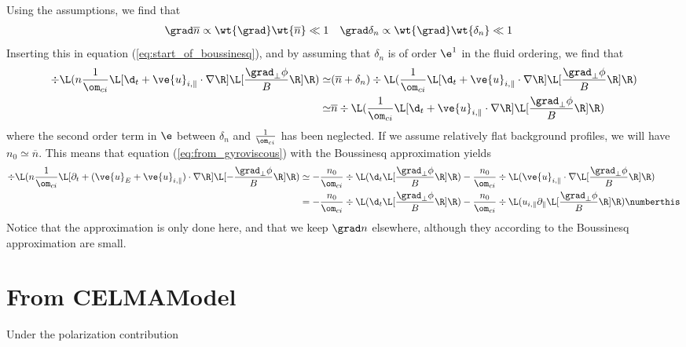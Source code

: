 Using the assumptions, we find that
%
\begin{align*}
    &\grad \overline{n} \propto \wt{\grad} \wt{\overline{n}} \ll 1
    &
    &\grad \delta_n \propto \wt{\grad} \wt{\delta_n} \ll 1&
\end{align*}
%
Inserting this in equation (\ref{eq:start_of_boussinesq}), and by assuming that
$\delta_n$ is of order $\e^1$ in the fluid ordering, we find that
%
\begin{align*}
 \div\L( n
  \frac{1}{\om_{ci}}
  \L[
      \d_t + \ve{u}_{i,\|}\cdot\nabla
  \R]
  \L[
     \frac{\grad_\perp \phi}{B}
  \R]
 \R)
 \simeq&
 (\overline{n} + \delta_n)\div\L(
  \frac{1}{\om_{ci}}
  \L[
      \d_t + \ve{u}_{i,\|}\cdot\nabla
  \R]
  \L[
     \frac{\grad_\perp \phi}{B}
  \R]
  \R)\\
 \simeq&
 \overline{n}\div\L(
  \frac{1}{\om_{ci}}
  \L[
      \d_t + \ve{u}_{i,\|}\cdot\nabla
  \R]
  \L[
     \frac{\grad_\perp \phi}{B}
  \R]
 \R)
\end{align*}
%
where the second order term in $\e$ between $\delta_n$ and $\frac{1}{\om_{ci}}$ has
been neglected. If we assume relatively flat background profiles, we will have
$n_0 \simeq \overline{n}$.  This means that equation
(\ref{eq:from_gyroviscous}) with the Boussinesq approximation yields
%
\begin{align*}
 \div\L( n
  \frac{1}{\om_{ci}}
  \L[ \partial_t + (\ve{u}_{E} + \ve{u}_{i,\|})\cdot\nabla \R]
  \L[ - \frac{\grad_\perp \phi}{B} \R] \R)
 &\simeq
 - \frac{n_0}{\om_{ci}} \div\L(
     \d_t \L[ \frac{\grad_\perp \phi}{B} \R] \R)
- \frac{n_0}{\om_{ci}} \div\L(
     \ve{u}_{i,\|}\cdot\nabla
 \L[ \frac{\grad_\perp \phi}{B} \R]
 \R)
 \\
 &=
 - \frac{n_0}{\om_{ci}} \div\L(
     \d_t \L[ \frac{\grad_\perp \phi}{B} \R] \R)
- \frac{n_0}{\om_{ci}} \div\L(
u_{i,\|}\partial_\| \L[ \frac{\grad_\perp \phi}{B} \R] \R)
\numberthis
\label{eq:boussinesq_vort}
\end{align*}
%
Notice that the approximation is only done here, and that we keep $\grad n$
elsewhere, although they according to the Boussinesq approximation are small.


\section{From CELMAModel}
Under the polarization contribution

